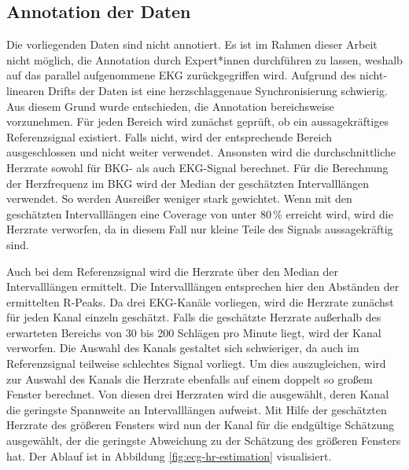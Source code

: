	
	\subsection{Annotation der Daten}\label{annotation}
	
	Die vorliegenden Daten sind nicht annotiert. Es ist im Rahmen dieser Arbeit nicht möglich, die Annotation durch Expert*innen durchführen zu lassen, weshalb auf das parallel aufgenommene \ac{EKG} zurückgegriffen wird. Aufgrund des nicht-linearen Drifts der Daten ist eine herzschlaggenaue Synchronisierung schwierig. Aus diesem Grund wurde entschieden, die Annotation bereichsweise vorzunehmen. Für jeden Bereich wird zunächst geprüft, ob ein aussagekräftiges Referenzsignal existiert. Falls nicht, wird der entsprechende Bereich ausgeschlossen und nicht weiter verwendet. Ansonsten wird die durchschnittliche Herzrate sowohl für BKG- als auch EKG-Signal berechnet. Für die Berechnung der Herzfrequenz im \ac{BKG} wird der Median der geschätzten Intervalllängen verwendet. So werden Ausreißer weniger stark gewichtet. Wenn mit den geschätzten Intervalllängen eine Coverage von unter 80\,\% erreicht wird, wird die Herzrate verworfen, da in diesem Fall nur kleine Teile des Signals aussagekräftig sind.
	
	Auch bei dem Referenzsignal wird die Herzrate über den Median der Intervalllängen ermittelt. Die Intervalllängen entsprechen hier den Abständen der ermittelten R-Peaks. Da drei \ac{EKG}-Kanäle vorliegen, wird die Herzrate zunächst für jeden Kanal einzeln geschätzt. Falls die geschätzte Herzrate außerhalb des erwarteten Bereichs von 30 bis 200 Schlägen pro Minute liegt, wird der Kanal verworfen. Die Auswahl des Kanals gestaltet sich schwieriger, da auch im Referenzsignal teilweise schlechtes Signal vorliegt. Um dies auszugleichen, wird zur Auswahl des Kanals die Herzrate ebenfalls auf einem doppelt so großem Fenster berechnet. Von diesen drei Herzraten wird die ausgewählt, deren Kanal die geringste Spannweite an Intervalllängen aufweist. Mit Hilfe der geschätzten Herzrate des größeren Fensters wird nun der Kanal für die endgültige Schätzung ausgewählt, der die geringste Abweichung zu der Schätzung des größeren Fensters hat. Der Ablauf ist in Abbildung \ref{fig:ecg-hr-estimation} visualisiert.
	
